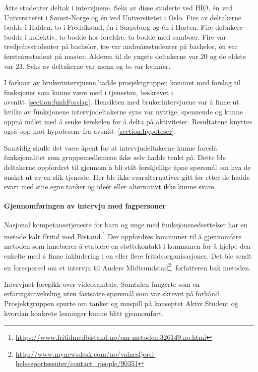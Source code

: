 Åtte studenter deltok i intervjuene. Seks av disse studerte ved HIØ, én ved Universitetet i Sørøst-Norge og én ved Universitetet i Oslo. Fire av deltakerne bodde i Halden, to i Fredrikstad, én i Sarpsborg og én i Horten. Fire deltakere bodde i kollektiv, to bodde hos foreldre, to bodde med samboer. Fire var tredjeårsstudenter på bachelor, tre var andreårsstudenter på bachelor, én var førsteårsstudent på master. Alderen til de yngste deltakerne var 20 og de eldste var 23. Seks av deltakerne var menn og to var kvinner.

I forkant av brukerintervjuene hadde prosjektgruppen kommet med forslag til funksjoner som kunne være med i tjenesten, beskrevet i avsnitt~\ref{section:funkForslag}. Hensikten med brukerintervjuene var å finne ut hvilke av funksjonene intervjudeltakerne syns var nyttige, spennende og kunne oppnå målet med å senke terskelen for å delta på aktiviteter. Resultatene knyttes også opp mot hypotesene fra avsnitt~\ref{section:hypoteser}.

Samtidig skulle det være åpent for at intervjudeltakerne kunne foreslå funksjonalitet som gruppemedlemene ikke selv hadde tenkt på. Dette ble deltakerne oppfordret til gjennom å bli stilt forskjellige åpne spørsmål om hva de ønsket ut av en slik tjeneste. Her ble ikke svaralternativer gitt før etter de hadde svart med sine egne tanker og ideér eller alternativt ikke kunne svare.

\paragraph{Gjennomføringen av intervju med fagpersoner}

\vspace{5mm} %
Nasjonal kompetansetjeneste for barn og unge med funksjonsnedsettelser har en metode kalt Fritid med Bistand.\footnote{\url{https://www.fritidmedbistand.no/om-metoden.326149.no.html}} Der oppfordres kommuner til å gjennomføre metoden som innebærer å etablere en støttekontakt i kommunen for å hjelpe den enkelte med å finne inkludering i en eller flere fritidsorganisasjoner. Det ble sendt en forespørsel om et intervju til Anders Midtsundstad\footnote{\url{http://www.mynewsdesk.com/no/valnesfjord-helsesportssenter/contact_people/90351}}, forfatteren bak metoden.
 
 \vspace{5mm} %
Intervjuet foregikk over videosamtale. Samtalen fungerte som en erfaringsutveksling uten fastsatte spørsmål som var skrevet på forhånd. Prosjektgruppen spurte om tanker og innspill på konseptet Aktiv Student og hvordan konkrete løsninger kunne blitt gjennomført.

